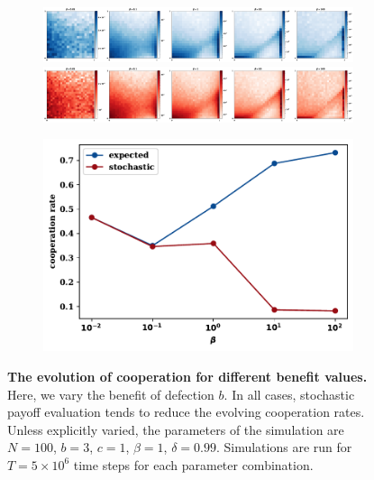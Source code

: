 \documentclass[11pt]{article}
\theoremstyle{plainCl1}
\theoremstyle{plainCl2}
\begin{document}
\begin{figure}[!htbp]
  \centering
  \begin{subfigure}{.65\textwidth}
    \centering
    \includegraphics[width=\textwidth]{static/expected_for_selection_strenght.pdf}
    \includegraphics[width=\textwidth]{static/stochastic_for_selection_strenght.pdf}
  \end{subfigure}%
  \begin{subfigure}{.35\textwidth}
    \vspace{.3cm}
    \includegraphics[width=\textwidth]{static/cooperation_rate_over_betas.pdf}
  \end{subfigure}
\caption{{\bf The evolution of cooperation for different benefit values.} 
Here, we vary the benefit of defection $b$. In all cases, stochastic payoff
evaluation tends to reduce the evolving cooperation rates. Unless explicitly
varied, the parameters of the simulation are $N\!=\!100$, $b\!=\!3$, $c\!=\!1$,
$\beta\!=\!1$, $\delta\!=\!0.99$. Simulations are run for $T\!=\!5\times 10^6$
time steps for each parameter
combination.}\label{fig:cooperation_rate_over_benefit}
\end{figure}
\end{document}
